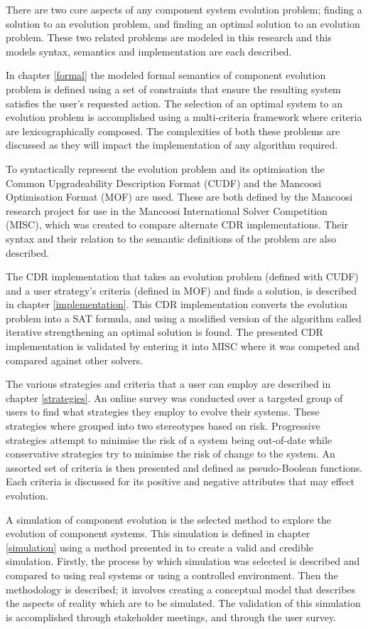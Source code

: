 There are two core aspects of any component system evolution problem; 
finding a solution to an evolution problem, and finding an optimal solution to an evolution problem.
These two related problems are modeled in this research and this models syntax, semantics and implementation are each described.

In chapter \ref{formal} the modeled formal semantics of component evolution problem is defined using a set of constraints that ensure the resulting system satisfies the user's requested action.
The selection of an optimal system to an evolution problem is accomplished using a multi-criteria framework where criteria are lexicographically composed.
The complexities of both these problems are discussed as they will impact the implementation of any algorithm required.

To syntactically represent the evolution problem and its optimisation the Common Upgradeability Description Format (CUDF) \citep{treinen2009common} and the Mancoosi Optimisation Format (MOF) are used.
These are both defined by the Mancoosi research project for use in the Mancoosi International Solver Competition (MISC), 
which was created to compare alternate CDR implementations.
Their syntax and their relation to the semantic definitions of the problem are also described.

The CDR implementation that takes an evolution problem (defined with CUDF) and a user strategy's criteria (defined in MOF) and finds a solution, is described in chapter \ref{implementation}.
This CDR implementation converts the evolution problem into a SAT formula, 
and using a modified version of the algorithm called iterative strengthening an optimal solution is found.
The presented CDR implementation is validated by entering it into MISC where it was competed and compared against other solvers.

The various strategies and criteria that a user can employ are described in chapter \ref{strategies}.
An online survey was conducted over a targeted group of users to find what strategies they employ to evolve their systems.
These strategies where grouped into two stereotypes based on risk.
Progressive strategies attempt to minimise the risk of a system being out-of-date while conservative strategies try to minimise the risk of change to the system.
An assorted set of criteria is then presented and defined as pseudo-Boolean functions.
Each criteria is discussed for its positive and negative attributes that may effect evolution.

A simulation of component evolution is the selected method to explore the evolution of component systems.
This simulation is defined in chapter \ref{simulation} using a method presented in \citep{Law2005} to create a valid and credible simulation.
Firstly, the process by which simulation was selected is described and compared to using real systems or using a controlled environment.
Then the methodology is described; it involves creating a conceptual model that describes the aspects of reality which are to be simulated.
The validation of this simulation is accomplished through stakeholder meetings, and through the user survey.

